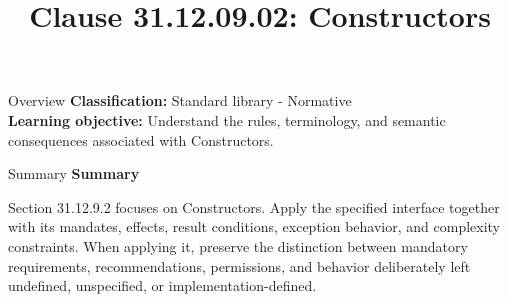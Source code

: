 \documentclass[10pt,letterpaper]{article}
\title{Clause 31.12.09.02: Constructors}
\author{}
\date{}
\begin{document}
\maketitle
\begin{CornellOverviewBox}{Overview}
\textbf{Classification:} Standard library - Normative\\[2pt]
\textbf{Learning objective:} Understand the rules, terminology, and semantic consequences associated with Constructors.
\end{CornellOverviewBox}\begin{CornellSummaryBox}{Summary}
{\sffamily\bfseries\color{Accent} Summary}\par\vspace{3pt}Section 31.12.9.2 focuses on Constructors. Apply the specified interface together with its mandates, effects, result conditions, exception behavior, and complexity constraints. When applying it, preserve the distinction between mandatory requirements, recommendations, permissions, and behavior deliberately left undefined, unspecified, or implementation-defined.
\end{CornellSummaryBox}
\end{document}

